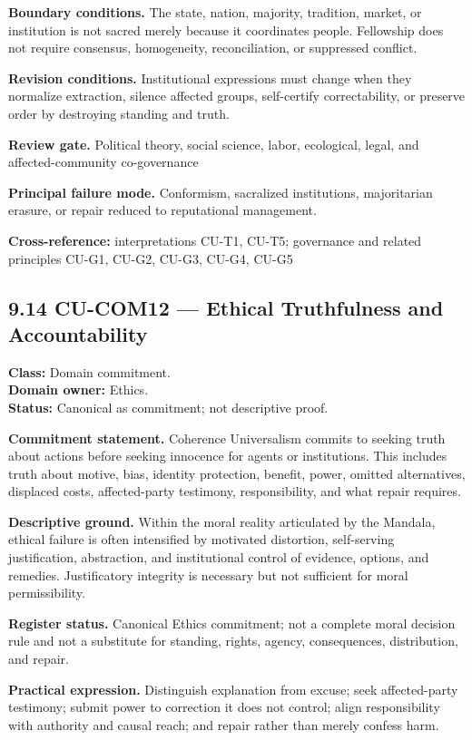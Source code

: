 \documentclass[
  11pt,
]{article}
\begin{document}
\textbf{Boundary conditions.} The state, nation, majority, tradition,
market, or institution is not sacred merely because it coordinates
people. Fellowship does not require consensus, homogeneity,
reconciliation, or suppressed conflict.

\textbf{Revision conditions.} Institutional expressions must change when
they normalize extraction, silence affected groups, self-certify
correctability, or preserve order by destroying standing and truth.

\textbf{Review gate.} Political theory, social science, labor,
ecological, legal, and affected-community co-governance

\textbf{Principal failure mode.} Conformism, sacralized institutions,
majoritarian erasure, or repair reduced to reputational management.

\textbf{Cross-reference:} interpretations CU-T1, CU-T5; governance and
related principles CU-G1, CU-G2, CU-G3, CU-G4, CU-G5

\subsection{9.14 CU-COM12 --- Ethical Truthfulness and
Accountability}\label{cu-com12-ethical-truthfulness-and-accountability}

\textbf{Class:} Domain commitment.\\
\textbf{Domain owner:} Ethics.\\
\textbf{Status:} Canonical as commitment; not descriptive proof.

\textbf{Commitment statement.} Coherence Universalism commits to seeking
truth about actions before seeking innocence for agents or institutions.
This includes truth about motive, bias, identity protection, benefit,
power, omitted alternatives, displaced costs, affected-party testimony,
responsibility, and what repair requires.

\textbf{Descriptive ground.} Within the moral reality articulated by the
Mandala, ethical failure is often intensified by motivated distortion,
self-serving justification, abstraction, and institutional control of
evidence, options, and remedies. Justificatory integrity is necessary
but not sufficient for moral permissibility.

\textbf{Register status.} Canonical Ethics commitment; not a complete
moral decision rule and not a substitute for standing, rights, agency,
consequences, distribution, and repair.

\textbf{Practical expression.} Distinguish explanation from excuse; seek
affected-party testimony; submit power to correction it does not
control; align responsibility with authority and causal reach; and
repair rather than merely confess harm.
\end{document}

